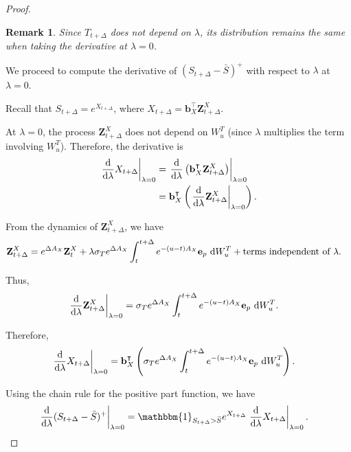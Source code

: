 \documentclass[10pt,a4paper,reqno]{amsart}
\newtheorem{remark}[theorem]{Remark}
\theoremstyle{example}
\newcommand*\D{\mathop{}\!\textnormal{d}}
\begin{document}
\begin{proof}
\begin{remark}
Since $T_{t+\Delta}$ does not depend on $\lambda$, its distribution remains the same when taking the derivative at $\lambda = 0$.
\end{remark}

We proceed to compute the derivative of $(S_{t+\Delta} - \bar{S})^+$ with respect to $\lambda$ at $\lambda = 0$.

Recall that $S_{t+\Delta} = e^{X_{t+\Delta}}$, where $X_{t+\Delta} = \mathbf{b}_X^\intercal \mathbf{Z}_{t+\Delta}^X$.

At $\lambda = 0$, the process $\mathbf{Z}_{t+\Delta}^X$ does not depend on $W_u^T$ (since $\lambda$ multiplies the term involving $W_u^T$). Therefore, the derivative is
\begin{align}
\left. \frac{\D}{\D \lambda} X_{t+\Delta} \right|_{\lambda = 0} &= \left. \frac{\D}{\D \lambda} \left( \mathbf{b}_X^\intercal \mathbf{Z}_{t+\Delta}^X \right) \right|_{\lambda = 0} \\
&= \mathbf{b}_X^\intercal \left( \left. \frac{\D}{\D \lambda} \mathbf{Z}_{t+\Delta}^X \right|_{\lambda = 0} \right).
\end{align}

From the dynamics of $\mathbf{Z}_{t+\Delta}^X$, we have
\begin{align}
\mathbf{Z}_{t+\Delta}^X &= e^{\Delta A_X} \mathbf{Z}_t^X + \lambda \sigma_T e^{\Delta A_X} \int_t^{t+\Delta} e^{-(u - t) A_X} \mathbf{e}_p \, \D W_u^T + \text{terms independent of } \lambda.
\end{align}

Thus,
\begin{align}
\left. \frac{\D}{\D \lambda} \mathbf{Z}_{t+\Delta}^X \right|_{\lambda = 0} &= \sigma_T e^{\Delta A_X} \int_t^{t+\Delta} e^{-(u - t) A_X} \mathbf{e}_p \, \D W_u^T.
\end{align}

Therefore,
\begin{align}
\left. \frac{\D}{\D \lambda} X_{t+\Delta} \right|_{\lambda = 0} &= \mathbf{b}_X^\intercal \left( \sigma_T e^{\Delta A_X} \int_t^{t+\Delta} e^{-(u - t) A_X} \mathbf{e}_p \, \D W_u^T \right).
\end{align}

Using the chain rule for the positive part function, we have
\begin{align}
\left. \frac{\D}{\D \lambda} (S_{t+\Delta} - \bar{S})^+ \right|_{\lambda = 0} &= \mathbbm{1}_{S_{t+\Delta} > \bar{S}} e^{X_{t+\Delta}} \left. \frac{\D}{\D \lambda} X_{t+\Delta} \right|_{\lambda = 0}.
\end{align}


\end{proof}
\end{document}
